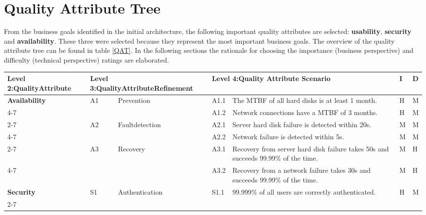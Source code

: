 \documentclass[a4paper,11pt]{report}
\begin{document}
\section{Quality Attribute Tree}
From the business goals identified in the initial architecture, the following important quality attributes are 
selected:  \textbf{usability}, \textbf{security} and \textbf{availability}. These three were selected because
they represent the most important business goals. The overview of the quality attribute 
tree can be found in table \ref{QAT}. In the following sections the rationale for choosing the importance 
(business perspective) and difficulty (technical perspective) ratings are elaborated.
\begin{table}[htpb]
\begin{center}
\begin{tabular}{| p{} | p{0.25cm}  p{2.5cm} | p{0.55cm}  p{7cm} | p{} | p{} | }
\hline
\textbf{Level 2:\newline Quality\newline Attribute} & \multicolumn{2}{p{2.75cm}|}{\textbf{Level 3:\newline Quality\newline Attribute\newline Refinement}} & \multicolumn{2}{p{6.65cm}|}{\textbf{Level 4:\newline Quality Attribute Scenario}} & \textbf{I} & \textbf{D}\\
\hline
\hline
\textbf{Availability} 	& A1 & Prevention 	& A1.1 & The MTBF of all hard disks is at least 1 month. & H & M   \\\cline{4-7}
			& &			& A1.2 & Network connections have a MTBF of 3 months.  & H & M  \\\cline{2-7}
			& A2 & Fault\newline detection 	& A2.1 & Server hard disk failure is detected within 20s. & M & M  \\\cline{4-7}
			& &			& A2.2 & Network failure is detected within 5s. & M & M  \\\cline{2-7}
			& A3 & Recovery 	& A3.1 & Recovery from server hard disk failure takes 50s and succeeds 99.99\% of the time. & M & H  \\\cline{4-7}
			& &			& A3.2 & Recovery from a network failure takes 30s and succeeds 99.99\% of the time. & M & H  \\\hline
\textbf{Security} 	& S1 & Authentication 	& S1.1 & 99.999\% of all users are correctly authenticated. & H & M   \\\cline{2-7}

\end{tabular}
\end{center}
\end{table}
\end{document}
